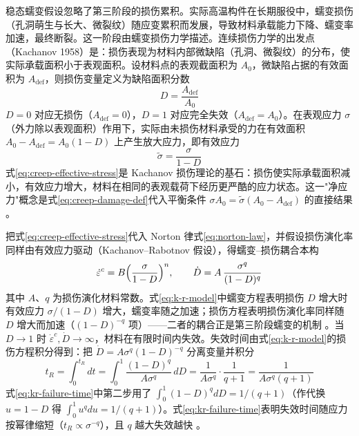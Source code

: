 稳态蠕变假设忽略了第三阶段的损伤累积。实际高温构件在长期服役中，蠕变损伤（孔洞萌生与长大、微裂纹）随应变累积而发展，导致材料承载能力下降、蠕变率加速，最终断裂。这一阶段由蠕变损伤力学描述。连续损伤力学的出发点（Kachanov 1958）是：损伤表现为材料内部微缺陷（孔洞、微裂纹）的分布，使实际承载面积小于表观面积。设材料点的表观截面积为 $A_{0}$，微缺陷占据的有效面积为 $A_{\mathrm{def}}$，则损伤变量定义为缺陷面积分数
\begin{equation}
  D=\frac{A_{\mathrm{def}}}{A_{0}}
  \label{eq:creep-damage-def}
\end{equation}
$D=0$ 对应无损伤（$A_{\mathrm{def}}=0$），$D=1$ 对应完全失效（$A_{\mathrm{def}}=A_{0}$）。在表观应力 $\sigma$（外力除以表观面积）作用下，实际由未损伤材料承受的力在有效面积 $A_{0}-A_{\mathrm{def}}=A_{0}(1-D)$ 上产生放大应力，即有效应力
\begin{equation}
  \tilde{\sigma}=\frac{\sigma}{1-D}
  \label{eq:creep-effective-stress}
\end{equation}
式\eqref{eq:creep-effective-stress}是 Kachanov 损伤理论的基石：损伤使实际承载面积减小，有效应力增大，材料在相同的表观载荷下经历更严酷的应力状态。这一"净应力"概念是式\eqref{eq:creep-damage-def}代入平衡条件 $\sigma A_{0}=\tilde{\sigma}(A_{0}-A_{\mathrm{def}})$ 的直接结果 \cite{MurakamiLiu1995}。

把式\eqref{eq:creep-effective-stress}代入 Norton 律式\eqref{eq:norton-law}，并假设损伤演化率同样由有效应力驱动（Kachanov--Rabotnov 假设），得蠕变--损伤耦合本构
\begin{equation}
  \dot{\varepsilon}^{c}=B\Bigl(\frac{\sigma}{1-D}\Bigr)^{n},
  \qquad
  \dot{D}=A\,\frac{\sigma^{q}}{(1-D)^{q}}
  \label{eq:k-r-model}
\end{equation}
其中 $A$、$q$ 为损伤演化材料常数。式\eqref{eq:k-r-model}中蠕变方程表明损伤 $D$ 增大时有效应力 $\sigma/(1-D)$ 增大，蠕变率随之加速；损伤方程表明损伤演化率同样随 $D$ 增大而加速（$(1-D)^{-q}$ 项）——二者的耦合正是第三阶段蠕变的机制 \cite{MurakamiLiu1995}。当 $D\to1$ 时 $\dot{\varepsilon}^{c},\dot{D}\to\infty$，材料在有限时间内失效。失效时间由式\eqref{eq:k-r-model}的损伤方程积分得到：把 $\dot{D}=A\sigma^{q}(1-D)^{-q}$ 分离变量并积分
\begin{equation}
  t_{R}=\int_{0}^{t_{R}}dt
  =\int_{0}^{1}\frac{(1-D)^{q}}{A\sigma^{q}}\,dD
  =\frac{1}{A\sigma^{q}}\cdot\frac{1}{q+1}
  =\frac{1}{A\sigma^{q}(q+1)}
  \label{eq:kr-failure-time}
\end{equation}
式\eqref{eq:kr-failure-time}中第二步用了 $\int_{0}^{1}(1-D)^{q}dD=1/(q+1)$（作代换 $u=1-D$ 得 $\int_{0}^{1}u^{q}du=1/(q+1)$）。式\eqref{eq:kr-failure-time}表明失效时间随应力按幂律缩短（$t_{R}\propto\sigma^{-q}$），且 $q$ 越大失效越快 \cite{MurakamiLiu1995}。

